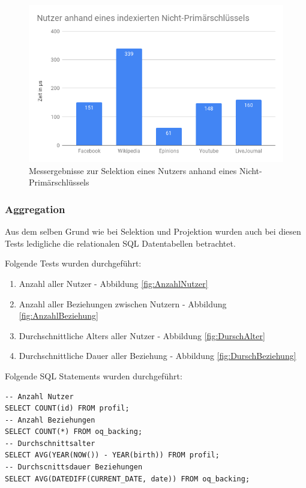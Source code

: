 \begin{figure}[h]
	\centering
	\includegraphics[width=\textwidth]{images/NutzerNPkI.png}
	\caption{Messergebnisse zur Selektion eines Nutzers anhand eines Nicht-Primärschlüssels}
	\label{fig:NutzerNPkI}
\end{figure}


\subsubsection{Aggregation}
Aus dem selben Grund wie bei Selektion und Projektion wurden auch bei diesen Tests ledigliche die relationalen SQL Datentabellen betrachtet.

Folgende Tests wurden durchgeführt:
\begin{enumerate}
	\item Anzahl aller Nutzer - Abbildung \ref{fig:AnzahlNutzer}
	\item Anzahl aller Beziehungen zwischen Nutzern - Abbildung \ref{fig:AnzahlBeziehung}
	\item Durchschnittliche Alters aller Nutzer - Abbildung \ref{fig:DurschAlter}
	\item Durchschnittliche Dauer aller Beziehung - Abbildung \ref{fig:DurschBeziehung}
\end{enumerate}

Folgende SQL Statements wurden durchgeführt:
\begin{lstlisting}
-- Anzahl Nutzer
SELECT COUNT(id) FROM profil;
-- Anzahl Beziehungen
SELECT COUNT(*) FROM oq_backing;
-- Durchschnittsalter
SELECT AVG(YEAR(NOW()) - YEAR(birth)) FROM profil;
-- Durchscnittsdauer Beziehungen
SELECT AVG(DATEDIFF(CURRENT_DATE, date)) FROM oq_backing;
\end{lstlisting}


